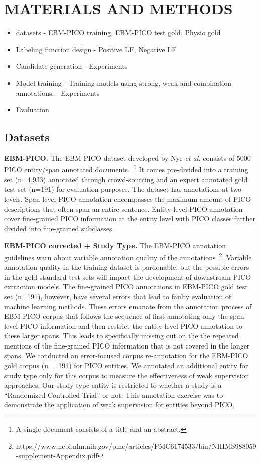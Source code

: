 \documentclass[10.7pt,]{article}
\begin{document}
\section{MATERIALS AND METHODS}\label{methods}
%
\begin{itemize}
    \item datasets - EBM-PICO training, EBM-PICO test gold, Physio gold
    \item Labeling function design - Positive LF, Negative LF
    \item Candidate generation - Experiments
    \item Model training - Training models using strong, weak and combination annotations. - Experiments
    \item Evaluation
\end{itemize}
%
%
%
\subsection{Datasets}\label{data}
%
\textbf{EBM-PICO.}
The EBM-PICO dataset developed by Nye \textit{et al.} consists of 5000 PICO entity/span annotated documents.~\footnote{A single document consists of a title and an abstract.}
It comes pre-divided into a training set (n=4,933) annotated through crowd-sourcing and an expert annotated gold test set (n=191) for evaluation purposes.
The dataset has annotations at two levels.
Span level PICO annotation encompasses the maximum amount of PICO descriptions that often span an entire sentence.
Entity-level PICO annotation cover fine-grained PICO information at the entity level with PICO classes further divided into fine-grained subclasses.



\textbf{EBM-PICO corrected + Study Type.}
The EBM-PICO annotation guidelines warn about variable annotation quality of the annotations~\footnote{https://www.ncbi.nlm.nih.gov/pmc/articles/PMC6174533/bin/NIHMS988059-supplement-Appendix.pdf}.
Variable annotation quality in the training dataset is pardonable, but the possible errors in the gold standard test sets will impact the development of downstream PICO extraction models.
The fine-grained PICO annotations in EBM-PICO gold test set (n=191), however, have several errors that lead to faulty evaluation of machine learning methods.
These errors emanate from the annotation process of EBM-PICO corpus that follows the sequence of first annotating only the span-level PICO information and then restrict the entity-level PICO annotation to these larger spans.
This leads to specifically missing out on the the repeated mentions of the fine-grained PICO information that is not covered in the longer spans. 
We conducted an error-focused corpus re-annotation for the EBM-PICO gold corpus (n = 191) for PICO entities.
We annotated an additional entity for study type only for this corpus to measure the effectiveness of weak supervision approaches.
Our study type entity is restricted to whether a study is a ``Randomized Controlled Trial'' or not.
This annotation exercise was to demonstrate the application of weak supervision for entities beyond PICO.
\end{document}
